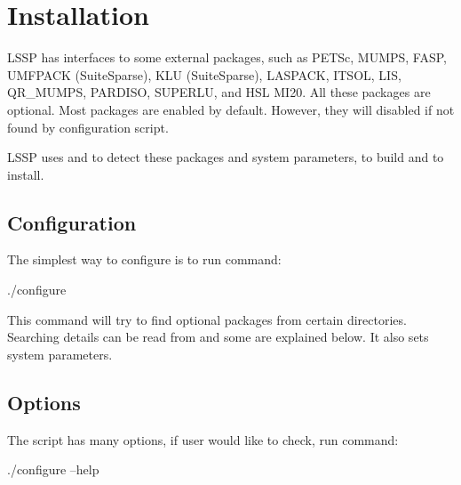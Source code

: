 
\chapter{Installation}

LSSP has interfaces to some external packages, such as PETSc, MUMPS, FASP, 
UMFPACK (SuiteSparse), KLU (SuiteSparse), LASPACK, ITSOL, LIS, QR\_MUMPS, 
PARDISO, SUPERLU, and HSL MI20. All these packages are optional. 
Most packages are enabled by default. However, they will disabled if not found by configuration
script.

LSSP uses {\color{blue}{\verb|autoconf|}} and {\color{blue}{\verb|make|}} 
to detect these packages and system parameters,
to build and to install.

\section{Configuration}
The simplest way to configure is to run command:
\begin{evb}
./configure
\end{evb}

This command will try to find optional packages from certain directories. Searching details can be read
from {\color{blue}{configure.in}} and some are explained below. It also sets system parameters.

\section{Options}
The script {\color{blue}{configure}} has many options, if user would like to check, 
run command:
\begin{evb}
./configure --help
\end{evb}


